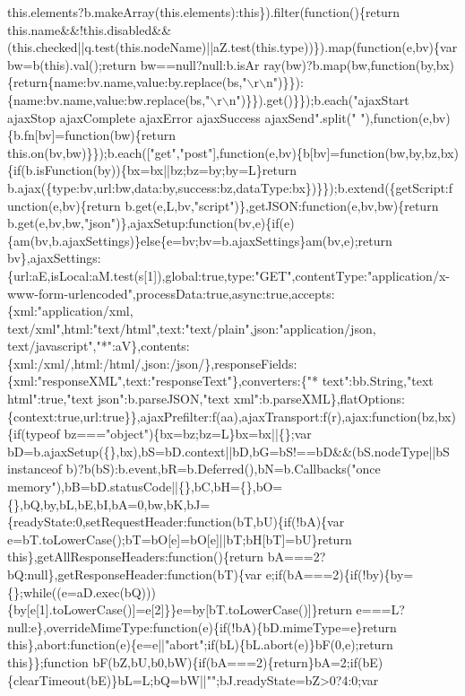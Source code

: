 \begin{DoxyCode}
{       this.elements?b.makeArray(this.elements):this\}).filter(function()\{return
       this.name&&!this.disabled&&(this.checked||q.test(this.nodeName)||aZ.test(this.type))\}).map(function(e,bv)\{var bw=b(this).val();return
       bw==null?null:b.isAr
      ray(bw)?b.map(bw,function(by,bx)\{return\{name:bv.name,value:by.replace(bs,"\(\backslash\)r\(\backslash\)n")\}\}):\{name:bv.name,value:bw.replace(bs,"\(\backslash\)r\(\backslash\)n")\}\}).get()\}\});b.each("ajaxStart ajaxStop ajaxComplete ajaxError ajaxSuccess
       ajaxSend".split(" "),function(e,bv)\{b.fn[bv]=function(bw)\{return
       this.on(bv,bw)\}\});b.each(["get","post"],function(e,bv)\{b[bv]=function(bw,by,bz,bx)\{if(b.isFunction(by))\{bx=bx||bz;bz=by;by=L\}return
       b.ajax(\{type:bv,url:bw,data:by,success:bz,dataType:bx\})\}\});b.extend(\{getScript:function(e,bv)\{return
       b.get(e,L,bv,"script")\},getJSON:function(e,bv,bw)\{return
       b.get(e,bv,bw,"json")\},ajaxSetup:function(bv,e)\{if(e)\{am(bv,b.ajaxSettings)\}else\{e=bv;bv=b.ajaxSettings\}am(bv,e);return
       bv\},ajaxSettings:\{url:aE,isLocal:aM.test(s[1]),global:true,type:"GET",contentType:"application/x-www-form-urlencoded",processData:true,async:true,accepts:\{xml:"application/xml,
       text/xml",html:"text/html",text:"text/plain",json:"application/json,
       text/javascript","*":aV\},contents:\{xml:/xml/,html:/html/,json:/json/\},responseFields:\{xml:"responseXML",text:"responseText"\},converters:\{"*
       text":bb.String,"text html":true,"text json":b.parseJSON,"text
       xml":b.parseXML\},flatOptions:\{context:true,url:true\}\},ajaxPrefilter:f(aa),ajaxTransport:f(r),ajax:function(bz,bx)\{if(typeof bz==="object")\{bx=bz;bz=L\}bx=bx||\{\};var
       bD=b.ajaxSetup(\{\},bx),bS=bD.context||bD,bG=bS!==bD&&(bS.nodeType||bS instanceof
       b)?b(bS):b.event,bR=b.Deferred(),bN=b.Callbacks("once
       memory"),bB=bD.statusCode||\{\},bC,bH=\{\},bO=\{\},bQ,by,bL,bE,bI,bA=0,bw,bK,bJ=\{readyState:0,setRequestHeader:function(bT,bU)\{if(!bA)\{var e=bT.toLowerCase();bT=bO[e]=bO[e]||bT;bH[bT]=bU\}return
       this\},getAllResponseHeaders:function()\{return bA===2?bQ:null\},getResponseHeader:function(bT)\{var
       e;if(bA===2)\{if(!by)\{by=\{\};while((e=aD.exec(bQ)))\{by[e[1].toLowerCase()]=e[2]\}\}e=by[bT.toLowerCase()]\}return
       e===L?null:e\},overrideMimeType:function(e)\{if(!bA)\{bD.mimeType=e\}return
       this\},abort:function(e)\{e=e||"abort";if(bL)\{bL.abort(e)\}bF(0,e);return this\}\};function
       bF(bZ,bU,b0,bW)\{if(bA===2)\{return\}bA=2;if(bE)\{clearTimeout(bE)\}bL=L;bQ=bW||"";bJ.readyState=bZ>0?4:0;var
}
\end{DoxyCode}
